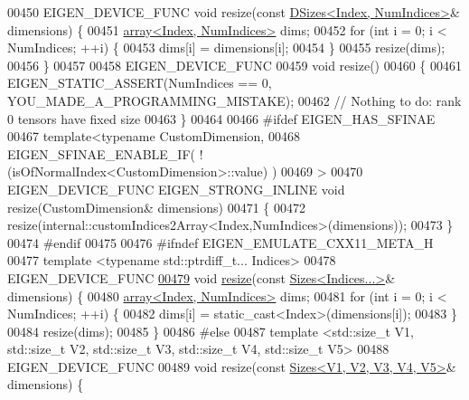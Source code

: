 \begin{DoxyCode}
00450     EIGEN\_DEVICE\_FUNC \textcolor{keywordtype}{void} resize(\textcolor{keyword}{const} \hyperlink{struct_eigen_1_1_d_sizes}{DSizes<Index, NumIndices>}& dimensions) \{
00451       \hyperlink{class_eigen_1_1array}{array<Index, NumIndices>} dims;
00452       \textcolor{keywordflow}{for} (\textcolor{keywordtype}{int} i = 0; i < NumIndices; ++i) \{
00453         dims[i] = dimensions[i];
00454       \}
00455       resize(dims);
00456     \}
00457 
00458     EIGEN\_DEVICE\_FUNC
00459     \textcolor{keywordtype}{void} resize()
00460     \{
00461       EIGEN\_STATIC\_ASSERT(NumIndices == 0, YOU\_MADE\_A\_PROGRAMMING\_MISTAKE);
00462       \textcolor{comment}{// Nothing to do: rank 0 tensors have fixed size}
00463     \}
00464 
00466 \textcolor{preprocessor}{#ifdef EIGEN\_HAS\_SFINAE}
00467     \textcolor{keyword}{template}<\textcolor{keyword}{typename} CustomDimension,
00468              EIGEN\_SFINAE\_ENABLE\_IF( !(isOfNormalIndex<CustomDimension>::value) )
00469     >
00470     EIGEN\_DEVICE\_FUNC EIGEN\_STRONG\_INLINE \textcolor{keywordtype}{void} resize(CustomDimension& dimensions)
00471     \{
00472       resize(internal::customIndices2Array<Index,NumIndices>(dimensions));
00473     \}
00474 \textcolor{preprocessor}{#endif}
00475 
00476 \textcolor{preprocessor}{#ifndef EIGEN\_EMULATE\_CXX11\_META\_H}
00477     \textcolor{keyword}{template} <\textcolor{keyword}{typename} std::ptrdiff\_t... Indices>
00478     EIGEN\_DEVICE\_FUNC
\hyperlink{class_eigen_1_1_tensor_a4f637a19784e5d0391882bd9fab0917e}{00479}     \textcolor{keywordtype}{void} \hyperlink{class_eigen_1_1_tensor_a4f637a19784e5d0391882bd9fab0917e}{resize}(\textcolor{keyword}{const} \hyperlink{struct_eigen_1_1_sizes}{Sizes<Indices...>}& dimensions) \{
00480       \hyperlink{class_eigen_1_1array}{array<Index, NumIndices>} dims;
00481       \textcolor{keywordflow}{for} (\textcolor{keywordtype}{int} i = 0; i < NumIndices; ++i) \{
00482         dims[i] = \textcolor{keyword}{static\_cast<}Index\textcolor{keyword}{>}(dimensions[i]);
00483       \}
00484       resize(dims);
00485     \}
00486 \textcolor{preprocessor}{#else}
00487     \textcolor{keyword}{template} <std::\textcolor{keywordtype}{size\_t} V1, std::\textcolor{keywordtype}{size\_t} V2, std::\textcolor{keywordtype}{size\_t} V3, std::\textcolor{keywordtype}{size\_t} V4, std::\textcolor{keywordtype}{size\_t} V5>
00488     EIGEN\_DEVICE\_FUNC
00489     \textcolor{keywordtype}{void} resize(\textcolor{keyword}{const} \hyperlink{struct_eigen_1_1_sizes}{Sizes<V1, V2, V3, V4, V5>}& dimensions) \{

\end{DoxyCode}
